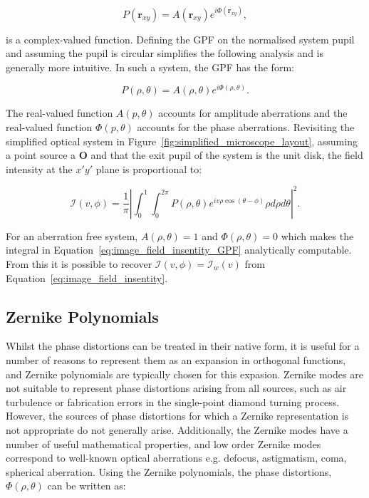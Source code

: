 \begin{equation}\label{eq:GPF}
P\left(\textbf{r}_{xy}\right) = A\left(\textbf{r}_{xy}\right)e^{i\Phi\left(\textbf{r}_{xy}\right)},
\end{equation}

is a complex-valued function. Defining the GPF on the normalised system 
pupil and assuming the pupil is circular simplifies the following analysis
and is generally more intuitive. In such a system, the GPF has the form:

\begin{equation}\label{eq:GPF_polar}
P\left(\rho,\theta\right) = A\left(\rho,\theta\right)e^{i\Phi\left(\rho,\theta\right)}.
\end{equation}

The real-valued function $A\left(p,\theta\right)$ accounts for amplitude
aberrations and the real-valued function $\Phi\left(p,\theta\right)$ 
accounts for the phase aberrations. Revisiting the simplified optical
system in Figure~\ref{fig:simplified_microscope_layout}, assuming a point
source a $\textbf{O}$ and that the exit pupil of the system is the unit 
disk, the field intensity at the $x'y'$ plane is proportional 
to\cite{goodman2005introduction,born2013principles}:

\begin{equation}\label{eq:image_field_insentity_GPF}
\mathcal{I}(v,\phi) = \frac{1}{\pi}\left|\int^{1}_{0}\int^{2\pi}_{0}P\left(\rho,\theta\right)e^{iv\rho\cos(\theta-\phi)}\rho d\rho d\theta\right|^{2}.
\end{equation}

For an aberration free system, $A\left(\rho,\theta\right) = 1$ and 
$\Phi\left(\rho,\theta\right) = 0$ which makes the integral in 
Equation~\ref{eq:image_field_insentity_GPF} analytically computable. From 
this it is possible to recover $\mathcal{I}(v,\phi) = \mathcal{I}_{w}(v)$
from Equation~\ref{eq:image_field_insentity}.

\subsection{Zernike Polynomials}
\label{subsec:zernike}

Whilst the phase distortions can be treated in their native form, it is 
useful for a number of reasons to represent them as an expansion in
orthogonal functions, and Zernike polynomials are typically chosen for 
this expasion\cite{zernike1934diffraction,noll1976zernike,mahajan1994zernike}.
Zernike modes are not suitable to represent phase distortions arising 
from all sources, such as air turbulence or fabrication errors in the 
single-point diamond turning process\cite{wyant1992basic}. However, the 
sources of phase distortions for which a Zernike representation is not
appropriate do not generally arise. Additionally, the Zernike modes have 
a number of useful mathematical properties, and low order Zernike modes 
correspond to well-known optical aberrations e.g. defocus, astigmatism, 
coma, spherical 
aberration\cite{born2013principles,booth2007adaptive,zernike1934diffraction}.
Using the Zernike polynomials, the phase distortions, $\Phi\left(\rho,\theta\right)$
can be written as:

